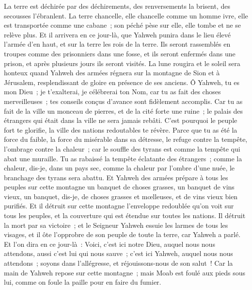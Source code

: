 \begin{multicols}{2}
La terre est déchirée par des déchirements, des renversements la brisent, des secousses l'ébranlent.
La terre chancelle, elle chancelle comme un homme ivre, elle est transportée comme une cabane~; son péché pèse sur elle, elle tombe et ne se relève plus.
Et il arrivera en ce jour-là, que Yahweh punira dans le lieu élevé l'armée d'en haut, et sur la terre les rois de la terre.
Ils seront rassemblés en troupes comme des prisonniers dans une fosse, et ils seront enfermés dans une prison, et après plusieurs jours ils seront visités.
La lune rougira et le soleil sera honteux quand Yahweh des armées régnera sur la montagne de Sion et à Jérusalem, resplendissant de gloire en présence de ses anciens.
\VerseOne{}Ô Yahweh, tu es mon Dieu~; je t'exalterai, je célébrerai ton Nom, car tu as fait des choses merveilleuses~; tes conseils conçus d'avance sont fidèlement accomplis.
Car tu as fait de la ville un monceau de pierres, et de la cité forte une ruine~; le palais des étrangers qui était dans la ville ne sera jamais rebâti.
C'est pourquoi le peuple fort te glorifie, la ville des nations redoutables te révère.
Parce que tu as été la force du faible, la force du misérable dans sa détresse, le refuge contre la tempête, l'ombrage contre la chaleur~; car le souffle des tyrans est comme la tempête qui abat une muraille.
Tu as rabaissé la tempête éclatante des étrangers~; comme la chaleur, dis-je, dans un pays sec, comme la chaleur par l'ombre d'une nuée, le branchage des tyrans sera abattu.
Et Yahweh des armées prépare à tous les peuples sur cette montagne un banquet de choses grasses, un banquet de vins vieux, un banquet, dis-je, de choses grasses et mœlleuses, et de vins vieux bien purifiés.
Et il détruit sur cette montagne l'enveloppe redoublée qu'on voit sur tous les peuples, et la couverture qui est étendue sur toutes les nations.
Il détruit la mort par sa victoire~; et le Seigneur Yahweh essuie les larmes de tous les visages, et il ôte l'opprobre de son peuple de toute la terre, car Yahweh a parlé.
Et l'on dira en ce jour-là~: Voici, c'est ici notre Dieu, auquel nous nous attendons, aussi c'est lui qui nous sauve~; c'est ici Yahweh, auquel nous nous attendons~; soyons dans l'allégresse, et réjouissons-nous de son salut~!
Car la main de Yahweh repose sur cette montagne~; mais Moab est foulé aux pieds sous lui, comme on foule la paille pour en faire du fumier.

\end{multicols}
